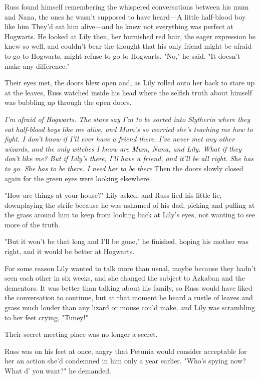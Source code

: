Russ found himself remembering the whispered conversations between his mum and Nana, the ones he wasn't supposed to have heard—A little half-blood boy like him{\el} They'd eat him alive—and he knew not everything was perfect at Hogwarts. He looked at Lily then, her burnished red hair, the eager expression he knew so well, and couldn't bear the thought that his only friend might be afraid to go to Hogwarts, might refuse to go to Hogwarts. "No," he said. "It doesn't make any difference."

Their eyes met, the doors blew open and, as Lily rolled onto her back to stare up at the leaves, Russ watched inside his head where the selfish truth about himself was bubbling up through the open doors.

\emph{I'm afraid of Hogwarts. The stars say I'm to be sorted into Slytherin where they eat half-blood boys like me alive, and Mum's so worried she's teaching me how to fight. I don't know if I'll ever have a friend there. I've never met any other wizards, and the only witches I know are Mum, Nana, and Lily. What if they don't like me? But if Lily's there, I'll have a friend, and it'll be all right. She has to go. She has to be there. I need her to be there{\el}} Then the doors slowly closed again for the green eyes were looking elsewhere.

"How are things at your house?" Lily asked, and Russ lied his little lie, downplaying the strife because he was ashamed of his dad, picking and pulling at the grass around him to keep from looking back at Lily's eyes, not wanting to see more of the truth.

"But it won't be that long and I'll be gone," he finished, hoping his mother was right, and it would be better at Hogwarts.

For some reason Lily wanted to talk more than usual, maybe because they hadn't seen each other in six weeks, and she changed the subject to Azkaban and the dementors. It was better than talking about his family, so Russ would have liked the conversation to continue, but at that moment he heard a rustle of leaves and grass much louder than any lizard or mouse could make, and Lily was scrambling to her feet crying, "Tuney!"

Their secret meeting place was no longer a secret.

Russ was on his feet at once, angry that Petunia would consider acceptable for her an action she'd condemned in him only a year earlier. "Who's spying now? What d' you want?" he demanded.


